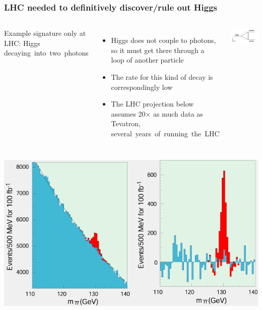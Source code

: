 \documentclass[compress]{beamer}
\begin{document}
\begin{frame}
\frametitle{LHC needed to definitively discover/rule out Higgs}

\begin{columns}
Example signature only at LHC: Higgs \mbox{decaying into two photons\hspace{-5 cm}}

\begin{itemize}
\item Higgs does not couple to photons, so it must get there through a
  loop of another particle

\item The rate for this kind of decay is correspondingly low

\item The LHC projection below assumes 20$\times$ as much data as Tevatron,
  \mbox{several years of running the LHC\hspace{-10 cm}}
\end{itemize}

\includegraphics[width=\linewidth]{higgs-to-gamma-gamma_diagram.png}
\end{columns}

\vfill
\includegraphics[width=0.6\linewidth]{higgs-to-gamma-gamma_100fb-1.png}
\end{frame}
\end{document}
